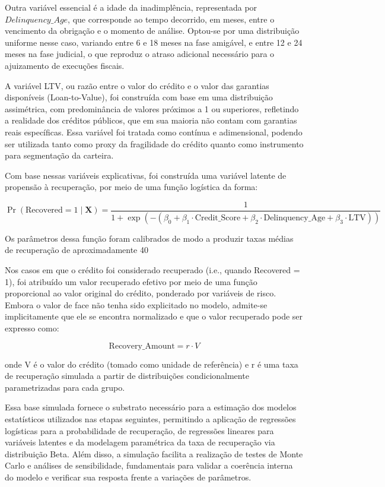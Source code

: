 \documentclass[a4paper,12pt]{article}
\begin{document}
Outra variável essencial é a idade da inadimplência, representada por $Delinquency\_Age$, que corresponde ao tempo decorrido, em meses, entre o vencimento da obrigação e o momento de análise. Optou-se por uma distribuição uniforme nesse caso, variando entre 6 e 18 meses na fase amigável, e entre 12 e 24 meses na fase judicial, o que reproduz o atraso adicional necessário para o ajuizamento de execuções fiscais.

A variável LTV, ou razão entre o valor do crédito e o valor das garantias disponíveis (Loan-to-Value), foi construída com base em uma distribuição assimétrica, com predominância de valores próximos a 1 ou superiores, refletindo a realidade dos créditos públicos, que em sua maioria não contam com garantias reais específicas. Essa variável foi tratada como contínua e adimensional, podendo ser utilizada tanto como proxy da fragilidade do crédito quanto como instrumento para segmentação da carteira.

Com base nessas variáveis explicativas, foi construída uma variável latente de propensão à recuperação, por meio de uma função logística da forma:

\[
\Pr(\text{Recovered} = 1 \mid \mathbf{X}) = \frac{1}{1 + \exp(-(\beta_0 + \beta_1 \cdot \text{Credit\_Score} + \beta_2 \cdot \text{Delinquency\_Age} + \beta_3 \cdot \text{LTV}))}
\]
 
Os parâmetros dessa função foram calibrados de modo a produzir taxas médias de recuperação de aproximadamente 40%

Nos casos em que o crédito foi considerado recuperado (i.e., quando Recovered = 1), foi atribuído um valor recuperado efetivo por meio de uma função proporcional ao valor original do crédito, ponderado por variáveis de risco. Embora o valor de face não tenha sido explicitado no modelo, admite-se implicitamente que ele se encontra normalizado e que o valor recuperado pode ser expresso como:

\[
\text{Recovery\_Amount} = r \cdot V
\]

onde V é o valor do crédito (tomado como unidade de referência) e r é uma taxa de recuperação simulada a partir de distribuições condicionalmente parametrizadas para cada grupo.

Essa base simulada fornece o substrato necessário para a estimação dos modelos estatísticos utilizados nas etapas seguintes, permitindo a aplicação de regressões logísticas para a probabilidade de recuperação, de regressões lineares para variáveis latentes e da modelagem paramétrica da taxa de recuperação via distribuição Beta. Além disso, a simulação facilita a realização de testes de Monte Carlo e análises de sensibilidade, fundamentais para validar a coerência interna do modelo e verificar sua resposta frente a variações de parâmetros.
\end{document}

